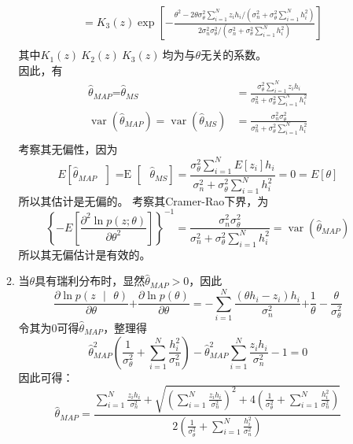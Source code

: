 \documentclass{article}
\begin{document}
\begin{enumerate}[1.]
\begin{enumerate}[(1)]
\[\begin{aligned}
 & ={{K}_{3}}(z)\exp \left[ -\frac{{{\theta }^{2}}-2\theta \sigma _{\theta }^{2}\sum\limits_{i=1}^{N}{{{z}_{i}}{{h}_{i}}}/\left( \sigma _{n}^{2}+\sigma _{\theta }^{2}\sum\limits_{i=1}^{N}{h_{i}^{2}} \right)}{2\sigma _{n}^{2}\sigma _{\theta }^{2}/\left( \sigma _{n}^{2}+\sigma _{\theta }^{2}\sum\limits_{i=1}^{N}{h_{i}^{2}} \right)} \right] \\ 
\end{aligned}\]
其中$K_1(z)\ K_2(z)\ K_3(z)\ $均为与$\theta$无关的系数。\\
因此，有
\[\begin{aligned}
  {{{\hat{\theta }}}_{MAP}}\text{=}{{{\hat{\theta }}}_{MS}}&=\frac{\sigma _{\theta }^{2}\sum\limits_{i=1}^{N}{{{z}_{i}}{{h}_{i}}}}{\sigma _{n}^{2}+\sigma _{\theta }^{2}\sum\limits_{i=1}^{N}{h_{i}^{2}}} \\ 
 \operatorname{var}({{{\hat{\theta }}}_{MAP}})=\operatorname{var}({{{\hat{\theta }}}_{MS}})&=\frac{\sigma _{n}^{2}\sigma _{\theta }^{2}}{\sigma _{n}^{2}+\sigma _{\theta }^{2}\sum\limits_{i=1}^{N}{h_{i}^{2}}} \\ 
\end{aligned}\]
考察其无偏性，因为
\[E[{{{\hat{\theta }}}_{MAP}}\text{ }\!\!]\!\!\text{ =E }\!\![\!\!\text{ }{{{\hat{\theta }}}_{MS}}]=\frac{\sigma _{\theta }^{2}\sum\limits_{i=1}^{N}{E[{{z}_{i}}]{{h}_{i}}}}{\sigma _{n}^{2}+\sigma _{\theta }^{2}\sum\limits_{i=1}^{N}{h_{i}^{2}}}=0=E[\theta ]\]
所以其估计是无偏的。
考察其Cramer-Rao下界，为
\[{{\left\{ -E\left[ \frac{{{\partial }^{2}}\ln p(z;\theta )}{\partial {{\theta }^{2}}} \right] \right\}}^{-1}}=\frac{\sigma _{n}^{2}\sigma _{\theta }^{2}}{\sigma _{n}^{2}+\sigma _{\theta }^{2}\sum\limits_{i=1}^{N}{h_{i}^{2}}}=\operatorname{var}\left( {{{\hat{\theta }}}_{MAP}} \right)\]
所以其无偏估计是有效的。
\item
当$\theta$具有瑞利分布时，显然\({{{\hat{\theta }}}_{MAP}}>0\)，因此
\[\frac{\partial \ln p(z\text{ }\!\!|\!\!\text{ }\theta )}{\partial \theta }\text{+}\frac{\partial \ln p(\theta )}{\partial \theta }=-\sum\limits_{i=1}^{N}{\frac{(\theta {{h}_{i}}-{{z}_{i}}){{h}_{i}}}{\sigma _{n}^{2}}}\text{+}\frac{1}{\theta }-\frac{\theta }{\sigma _{\theta }^{2}}\]
令其为0可得\({{{\hat{\theta }}}_{MAP}}\)，整理得
\[\hat{\theta }_{MAP}^{2}\left( \frac{1}{\sigma _{\theta }^{2}}+\sum\limits_{i=1}^{N}{\frac{h_{i}^{2}}{\sigma _{n}^{2}}} \right)-\hat{\theta }_{MAP}^{2}\sum\limits_{i=1}^{N}{\frac{{{z}_{i}}{{h}_{i}}}{\sigma _{n}^{2}}}-1=0\]
因此可得：
\[{{{\hat{\theta }}}_{MAP}}=\frac{\sum\limits_{i=1}^{N}{\frac{{{z}_{i}}{{h}_{i}}}{\sigma _{n}^{2}}}+\sqrt{{{\left( \sum\limits_{i=1}^{N}{\frac{{{z}_{i}}{{h}_{i}}}{\sigma _{n}^{2}}} \right)}^{2}}+4\left( \frac{1}{\sigma _{\theta }^{2}}+\sum\limits_{i=1}^{N}{\frac{h_{i}^{2}}{\sigma _{n}^{2}}} \right)}}{2\left( \frac{1}{\sigma _{\theta }^{2}}+\sum\limits_{i=1}^{N}{\frac{h_{i}^{2}}{\sigma _{n}^{2}}} \right)}\]
\end{enumerate}
\end{enumerate}
\end{document}
